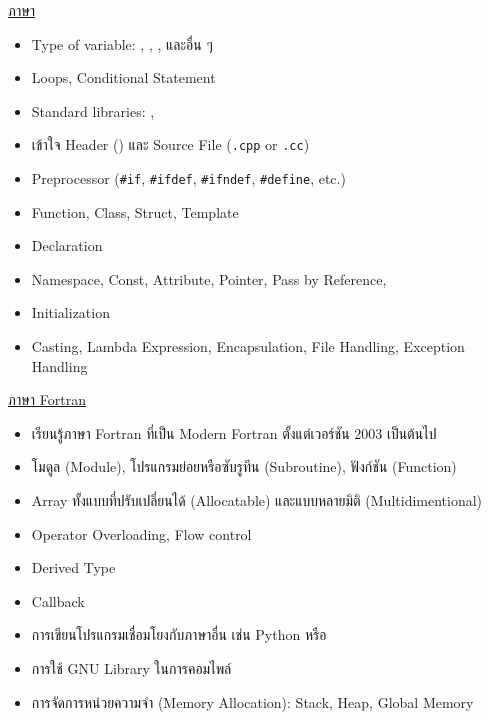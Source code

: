\noindent \underline{ภาษา \cpp}
%
\begin{itemize}[topsep=0pt,noitemsep]
  \item Type of variable: , , ,  และอื่น ๆ

  \item Loops, Conditional Statement

  \item Standard libraries: , 

  \item เข้าใจ Header () และ Source File (\texttt{.cpp} or \texttt{.cc})

  \item Preprocessor (\texttt{\#if}, \texttt{\#ifdef}, \texttt{\#ifndef}, \texttt{\#define}, etc.)

  \item Function, Class, Struct, Template

  \item Declaration

  \item Namespace, Const, Attribute, Pointer, Pass by Reference, 

  \item Initialization

  \item Casting, Lambda Expression, Encapsulation, File Handling, Exception Handling
\end{itemize}

\noindent \underline{ภาษา Fortran}
%
\begin{itemize}[topsep=0pt,noitemsep]
  \item เรียนรู้ภาษา Fortran ที่เป็น Modern Fortran ตั้งแต่เวอร์ชัน 2003 เป็นต้นไป

  \item โมดูล (Module), โปรแกรมย่อยหรือซับรูทีน (Subroutine), ฟังก์ชัน (Function)

  \item Array ทั้งแบบที่ปรับเปลี่ยนได้ (Allocatable) และแบบหลายมิติ (Multidimentional)

  \item Operator Overloading, Flow control

  \item Derived Type

  \item Callback

  \item การเขียนโปรแกรมเชื่อมโยงกับภาษาอื่น เช่น Python หรือ \cpp

  \item การใช้ GNU Library ในการคอมไพล์

  \item การจัดการหน่วยความจำ (Memory Allocation): Stack, Heap, Global Memory
\end{itemize}

